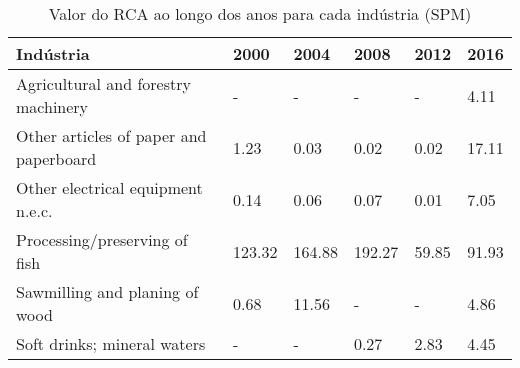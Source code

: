\begin{table}
\centering
\caption{Valor do RCA ao longo dos anos para cada indústria (SPM)}
\label{tab:ex3-tempo-SPM}
\begin{tabular}{p{6cm}p{1.5cm}p{1.5cm}p{1.5cm}p{1.5cm}p{1.5cm}}
\toprule
                             Indústria &   2000 &   2004 &   2008 &  2012 &  2016 \\
\midrule
   Agricultural and forestry machinery &      - &      - &      - &     - &  4.11 \\
Other articles of paper and paperboard &   1.23 &   0.03 &   0.02 &  0.02 & 17.11 \\
     Other electrical equipment n.e.c. &   0.14 &   0.06 &   0.07 &  0.01 &  7.05 \\
         Processing/preserving of fish & 123.32 & 164.88 & 192.27 & 59.85 & 91.93 \\
        Sawmilling and planing of wood &   0.68 &  11.56 &      - &     - &  4.86 \\
           Soft drinks; mineral waters &      - &      - &   0.27 &  2.83 &  4.45 \\
\bottomrule
\end{tabular}
\end{table}
